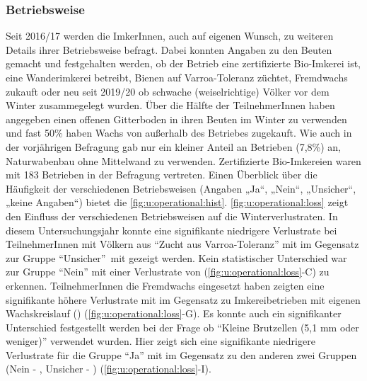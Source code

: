 \subsubsection{Betriebsweise}
\label{ss:betriebsweise:U}

Seit 2016/17 werden die ImkerInnen, auch auf eigenen Wunsch, zu weiteren Details ihrer Betriebsweise befragt. Dabei konnten Angaben zu den Beuten gemacht und festgehalten werden, ob der Betrieb eine zertifizierte Bio-Imkerei ist, eine Wanderimkerei betreibt, Bienen auf Varroa-Toleranz züchtet, Fremdwachs zukauft oder neu seit 2019/20 ob schwache (weiselrichtige) Völker vor dem Winter zusammegelegt wurden. Über die Hälfte der TeilnehmerInnen haben angegeben einen offenen Gitterboden in ihren Beuten im Winter zu verwenden und fast 50\% haben Wachs von außerhalb des Betriebes zugekauft. Wie auch in der vorjährigen Befragung gab nur ein kleiner Anteil an Betrieben (7,8\%) an, Naturwabenbau ohne Mittelwand zu verwenden. Zertifizierte Bio-Imkereien waren mit 183 Betrieben in der Befragung vertreten. Einen Überblick über die Häufigkeit der verschiedenen Betriebsweisen (Angaben „Ja``, „Nein``, „Unsicher``, „keine Angaben``) bietet die \cref{fig:u:operational:hist}. 
\newline
\cref{fig:u:operational:loss} zeigt den Einfluss der verschiedenen Betriebsweisen auf die Winterverlustraten. In diesem Untersuchungsjahr konnte eine signifikante niedrigere Verlustrate bei TeilnehmerInnen mit Völkern aus \enquote{Zucht aus Varroa-Toleranz} mit  im Gegensatz zur Gruppe \enquote{Unsicher} mit  gezeigt werden. Kein statistischer Unterschied war zur Gruppe \enquote{Nein} mit einer Verlustrate von  (\cref{fig:u:operational:loss}-C) zu erkennen. TeilnehmerInnen die Fremdwachs eingesetzt haben zeigten eine signifikante höhere Verlustrate mit  im Gegensatz zu Imkereibetrieben mit eigenen Wachskreislauf () (\cref{fig:u:operational:loss}-G). Es konnte auch ein signifikanter Unterschied festgestellt werden bei der Frage ob \enquote{Kleine Brutzellen (5,1 mm oder weniger)} verwendet wurden. Hier zeigt sich eine signifikante niedrigere Verlustrate für die Gruppe \enquote{Ja} mit  im Gegensatz zu den anderen zwei Gruppen (Nein - , Unsicher - ) (\cref{fig:u:operational:loss}-I).
\newline

